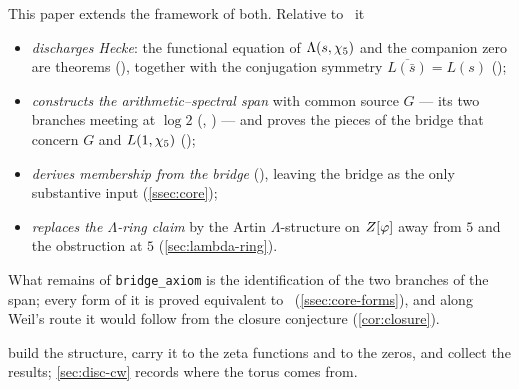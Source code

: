 This paper extends the framework of both.  Relative to~\cite{gonzalez25hp} it
\begin{itemize}
  \item \emph{discharges Hecke}: the functional equation of $\Lambda(s,\chi_5)$ and
    the companion zero are theorems (), together with the conjugation symmetry
    $\overline{L(\bar s)}=L(s)$ ();
  \item \emph{constructs the arithmetic--spectral span} with common source $G$ ---
    its two branches meeting at $\log2$ (,
    ) --- and proves the pieces of the
    bridge that concern $G$ and $L(1,\chi_5)$ ();
  \item \emph{derives membership from the bridge}
    (), leaving the bridge as the only
    substantive input (\cref{ssec:core});
  \item \emph{replaces the $\Lambda$-ring claim} by the Artin $\Lambda$-structure on
    $Z[\varphi]$ away from $5$ and the obstruction at $5$ (\cref{sec:lambda-ring}).
\end{itemize}
What remains of \texttt{bridge\_axiom} is the identification of the two branches of
the span; every form of it is proved
equivalent to \Ecore\ (\cref{ssec:core-forms}), and along Weil's route it would follow from the closure conjecture (\cref{cor:closure}).



 build the structure, carry it to the zeta functions and to the zeros, and collect the results; \cref{sec:disc-cw} records where the torus comes from.

